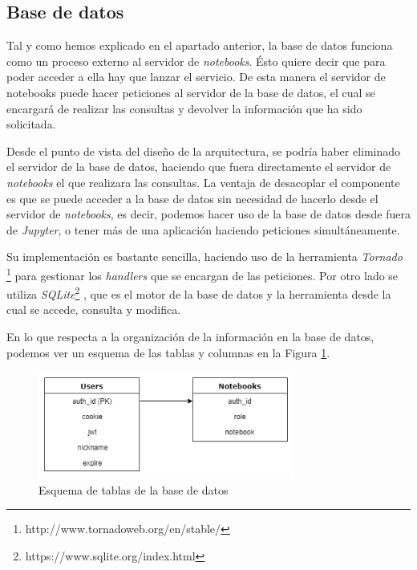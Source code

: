 \documentclass[11pt,spanish,listoffigures]{tfgetsinf}
\begin{document}
\subsection{Base de datos}
\label{subsec:diseno-bd}

Tal y como hemos explicado en el apartado anterior, la base de datos funciona como un proceso externo al servidor de \textit{notebooks}. Ésto quiere decir que para poder acceder a ella hay que lanzar el servicio. De esta manera el servidor de notebooks puede hacer peticiones al servidor de la base de datos, el cual se encargará de realizar las consultas y devolver la información que ha sido solicitada. 

Desde el punto de vista del diseño de la arquitectura, se podría haber eliminado el servidor de la base de datos, haciendo que fuera directamente el servidor de \textit{notebooks} el que realizara las consultas. La ventaja de desacoplar el componente es que se puede acceder a la base de datos sin necesidad de hacerlo desde el servidor de \textit{notebooks}, es decir, podemos hacer uso de la base de datos desde fuera de \textit{Jupyter}, o tener más de una aplicación haciendo peticiones simultáneamente. 

Su implementación es bastante sencilla, haciendo uso de la herramienta \textit{Tornado}  \footnote{http://www.tornadoweb.org/en/stable/} para gestionar los \textit{handlers} que se encargan de las peticiones. Por otro lado se utiliza \textit{SQLite}\footnote{https://www.sqlite.org/index.html} , que es el motor de la base de datos y la herramienta desde la cual se accede, consulta y modifica. 

En lo que respecta a la organización de la información en la base de datos, podemos ver un esquema de las tablas y columnas en la Figura \ref{fig:db-scheme}. 

\begin{figure}[h]
	\centering
  	\includegraphics[width=0.75\textwidth]{database.png}
  	\caption{Esquema de tablas de la base de datos}
  	\label{fig:db-scheme}
\end{figure}
\end{document}
